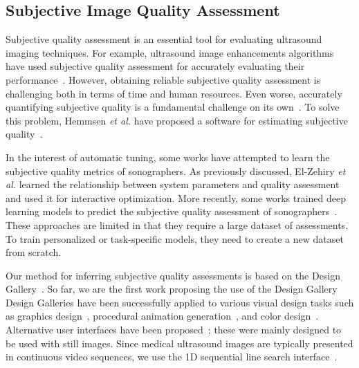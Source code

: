 \subsection{Subjective Image Quality Assessment}
Subjective quality assessment is an essential tool for evaluating ultrasound imaging techniques.
For example, ultrasound image enhancements algorithms have used subjective quality assessment for accurately evaluating their performance~\cite{loizou_quality_2006, hemmsen_ultrasound_2010, wong_monte_2012, kang_new_2016, mishra_edge_2018}.
However, obtaining reliable subjective quality assessment is challenging both in terms of time and human resources.
Even worse, accurately quantifying subjective quality is a fundamental challenge on its own~\cite{streijl_mean_2016}.
To solve this problem, Hemmsen \textit{et al.} have proposed a software for estimating subjective quality~\cite{hemmsen_ultrasound_2010}.

In the interest of automatic tuning, some works have attempted to learn the subjective quality metrics of sonographers.
As previously discussed, El-Zehiry \textit{et al.} learned the relationship between system parameters and quality assessment and used it for interactive optimization.
More recently, some works trained deep learning models to predict the subjective quality assessment of sonographers~\cite{abdi_automatic_2017, annangi_ai_2020}.
These approaches are limited in that they require a large dataset of assessments.
To train personalized or task-specific models, they need to create a new dataset from scratch.

Our method for inferring subjective quality assessments is based on the Design Gallery~\cite{10.1145/258734.258887}.
So far, we are the first work proposing the use of the Design Gallery 
Design Galleries have been successfully applied to various visual design tasks such as graphics design~\cite{10.1145/258734.258887}, procedural animation generation~\cite{brochu_bayesian_2010}, and color design~\cite{phan_color_2018}.
Alternative user interfaces have been proposed~\cite{phan_color_2018, 10.1145/3072959.3073598, koyama_sequential_2020}; these were mainly designed to be used with still images.
Since medical ultrasound images are typically presented in continuous video sequences, we use the 1D sequential line search interface~\cite{10.1145/3072959.3073598}.




